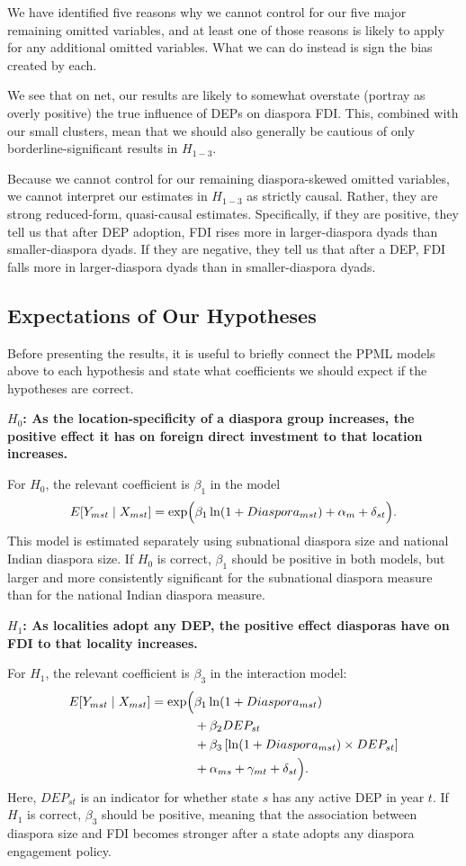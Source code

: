 \documentclass[12pt]{article}
\let\oldsubsection\subsection
\renewcommand{\subsection}{\FloatBarrier\oldsubsection}
\begin{document}
We have identified five reasons why we cannot control for our five major remaining omitted variables, and at least one of those reasons is likely to apply for any additional omitted variables. What we can do instead is sign the bias created by each. 

We see that on net, our results are likely to somewhat overstate (portray as overly positive) the true influence of DEPs on diaspora FDI. This, combined with our small clusters, mean that we should also generally be cautious of only borderline-significant results in $H_{1-3}$. 

Because we cannot control for our remaining diaspora-skewed omitted variables, we cannot interpret our estimates in $H_{1-3}$ as strictly causal. Rather, they are strong reduced-form, quasi-causal estimates. Specifically, if they are positive, they tell us that after DEP adoption, FDI rises more in larger-diaspora dyads than smaller-diaspora dyads. If they are negative, they tell us that after a DEP, FDI falls more in larger-diaspora dyads than in smaller-diaspora dyads. 


\subsection{Expectations of Our Hypotheses} \label{ss:expectations}

Before presenting the results, it is useful to briefly connect the PPML models above to each hypothesis and state what coefficients we should expect if the hypotheses are correct.

\textbf{$H_0$: As the location-specificity of a diaspora group increases, the positive effect it has on foreign direct investment to that location increases.}

For $H_0$, the relevant coefficient is $\beta_1$ in the model
\[
E[Y_{mst} \mid X_{mst}] =
\exp \Bigl(
\beta_1 \ln(1+Diaspora_{mst})
+ \alpha_{m}
+ \delta_{st}
\Bigr).
\]
This model is estimated separately using subnational diaspora size and national Indian diaspora size. If $H_0$ is correct, $\beta_1$ should be positive in both models, but larger and more consistently significant for the subnational diaspora measure than for the national Indian diaspora measure.

\textbf{$H_1$: As localities adopt any DEP, the positive effect diasporas have on FDI to that locality increases.}

For $H_1$, the relevant coefficient is $\beta_3$ in the interaction model:
\[
\begin{aligned}
E[Y_{mst} \mid X_{mst}] =
\exp \Bigl(
&\beta_1 \ln(1+Diaspora_{mst}) \\
&+ \beta_2 DEP_{st} \\
&+ \beta_3 \left[\ln(1+Diaspora_{mst}) \times DEP_{st}\right] \\
&+ \alpha_{ms}
+ \gamma_{mt}
+ \delta_{st}
\Bigr).
\end{aligned}
\]
Here, $DEP_{st}$ is an indicator for whether state $s$ has any active DEP in year $t$. If $H_1$ is correct, $\beta_3$ should be positive, meaning that the association between diaspora size and FDI becomes stronger after a state adopts any diaspora engagement policy.
\end{document}

